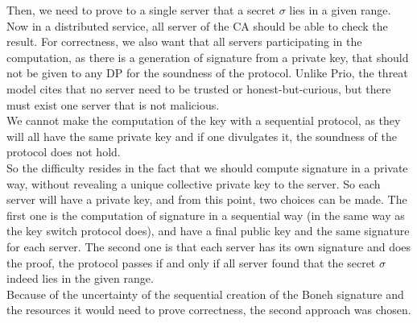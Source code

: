 \documentclass{article}
\begin{document}
Then, we need to prove to a single server that a secret $\sigma$ lies in a given range. Now in a distributed service, all server of the CA should be able to check the result. For correctness, we also want that all servers participating in the computation, as there is a generation of signature from a private key, that should not be given to any DP for the soundness of the protocol. Unlike Prio, the threat model cites that no server need to be trusted or honest-but-curious, but there must exist one server that is not malicious.\\
We cannot make the computation of the key with a sequential protocol, as they will all have the same private key and if one divulgates it, the soundness of the protocol does not hold. \\

So the difficulty resides in the fact that we should compute signature in a private way, without revealing a unique collective private key to the server. So each server will have a private key, and from this point, two choices can be made. The first one is the computation of signature in a sequential way (in the same way as the key switch protocol does), and have a final public key and the same signature for each server. The second one is that each server has its own signature and does the proof, the protocol passes if and only if all server found that the secret $\sigma$ indeed lies in the given range.\\
Because of the uncertainty of the sequential creation of the Boneh signature and the resources it would need to prove correctness, the second approach was chosen.
\end{document}
